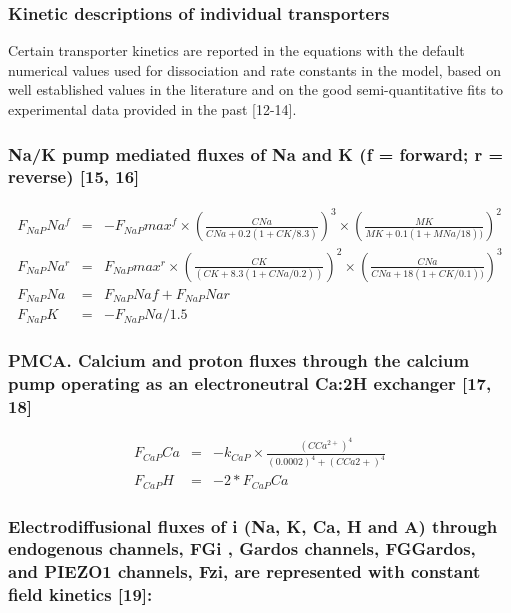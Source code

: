 \documentclass[a4paper]{article}
\newcommand{\med}[1]{M#1}
\newcommand{\cell}[1]{C#1}
\newcommand{\MNa}{\med{Na}}
\newcommand{\MK}{\med{K}}
\newcommand{\CNa}{\cell{Na}}
\newcommand{\CK}{\cell{K}}
\newcommand{\CCatp}{\cell{Ca^{2+}}}
\newcommand{\CCa}{\cell{Ca}}
\newcommand{\F}[2]{F_{#1}#2}
\newcommand{\kk}[2]{k_{#1}#2}
\begin{document}
\subsubsection{Kinetic descriptions of individual transporters}
Certain transporter kinetics are reported in the equations with the default numerical values used for dissociation and rate constants in the model, based on well established values in the literature and on the good semi-quantitative fits to experimental data provided in the past [12-14].  

\setcounter{equation}{0}
\renewcommand{\theequation}{11.\alph{equation}}


\subsubsection{Na/K pump mediated fluxes of Na and K (f = forward; r = reverse) [15, 16]}

\begin{eqnarray}
\F{NaP}{Na}^f  &=& -\F{NaP}{max}^f\times\left(\frac{\CNa}{\CNa + 0.2(1 + \CK/8.3)}\right)^3 \times\left(\frac{\MK}{\MK + 0.1(1 + \MNa/18))}\right)^2 \\
\F{NaP}{Na}^r  &=& \F{NaP}{max}^r\times\left(\frac{\CK}{(\CK + 8.3(1 + \CNa/0.2))}\right)^2\times\left(\frac{\CNa}{\CNa + 18(1 + \CK/0.1))}\right)^3 \\
\F{NaP}{Na} &=& \F{NaP}{Naf} + \F{NaP}{Nar} \\
\F{NaP}{K} &=& -\F{NaP}{Na}/1.5
\end{eqnarray}

\subsubsection{PMCA. Calcium and proton fluxes through the calcium pump operating as an electroneutral Ca:2H exchanger  [17, 18]}

\setcounter{equation}{0}
\renewcommand{\theequation}{12.\alph{equation}}

\begin{eqnarray}
\F{CaP}{Ca} &=& -\kk{CaP}{}\times\frac{(\CCatp)^4}{(0.0002)^4 + (\CCa2+)^4}\\
\F{CaP}{H} &=& -2*\F{CaP}{Ca}
\end{eqnarray}

\subsubsection{Electrodiffusional fluxes of i (Na, K, Ca, H and A) through endogenous channels, FGi , Gardos channels, FGGardos, and PIEZO1 channels, Fzi, are represented with constant field kinetics [19]: }
\end{document}
